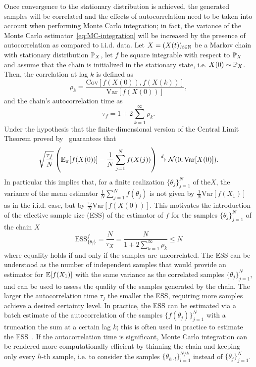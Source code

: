 Once convergence to the stationary distribution is achieved, the generated samples will be correlated and the effects of autocorrelation need to be taken into account when performing Monte Carlo integration; in fact, the variance of the Monte Carlo estimator~\eqref{eq:MC-integration} will be increased by the presence of autocorrelation as compared to i.i.d. data.
Let $X = (X(t))_{t\in \mathbb N}$ be a Markov chain with stationary distribution $\mathbb P_X$, let $f$ be square integrable with respect to $\mathbb P_X$ and assume that the chain is initialized in the stationary state, i.e. $X(0) \sim \mathbb P_X$.
Then, the correlation at lag $k$ is defined as
\[
    \rho_k = \frac{\text{Cov}[f(X(0)), f(X(k))]}{\text{Var}[f(X(0))]},
\]
and the chain's autocorrelation time as
\[
    \tau_f = 1 + 2 \sum_{k=1}^{\infty} \rho_k.
\]
Under the hypothesis that the finite-dimensional version of the Central Limit Theorem proved by~\cite{KipnisVaradhan1986} guarantees that 
\[
    \sqrt{\frac{\tau_f}{N}} \left(  \mathbb E_\pi [f(X(0))] - \frac{1}{N} \sum_{j=1}^{N} f(X(j)) \right) \xrightarrow{d} \mathcal N(0, \text{Var}[X(0)]).
\]
In particular this implies that, for a finite realization $\{ \theta_j\}_{j=1}^N$ of the$X$, the variance of the mean estimator $\frac{1}{N} \sum_{j=1}^{N} f(\theta_j)$ is not given by $\frac{1}{N} \text{Var}[f(X_1)]$ as in the i.i.d. case, but by $\frac{\tau_f}{N} \text{Var}[f(X(0))]$.
This motivates the introduction of the effective sample size (ESS) of the estimator of $f$ for the samples $\{\theta_j\}_{j=1}^N$ of the chain $X$
\begin{equation}
    \text{ESS}_{\{\theta_j\}}^f = \frac{N}{\tau_X} = \frac{N}{1 + 2 \sum_{k=1}^{\infty} \rho_k} \leq N
\end{equation}
where equality holds if and only if the samples are uncorrelated.
The ESS can be understood as the number of independent samples that would provide an estimator for $\mathbb E[f(X_1)]$ with the same variance as the correlated samples $\{\theta_j\}_{j=1}^N$, and can be used to assess the quality of the samples generated by the chain.
The larger the autocorrelation time $\tau_f$ the smaller the ESS, requiring more samples achieve a desired certainty level.
In practice, the ESS can be estimated via a batch estimate of the autocorrelation of the samples $\{f(\theta_j)\}_{j=1}^N$ with a truncation the sum at a certain lag $k$; this is often used in practice to estimate the ESS~\cite{Geyer1992}.
If the autocorrelation time is significant, Monte Carlo integration can be rendered more computationally efficient by thinning the chain and keeping only every $h$-th sample, i.e. to consider the samples $\{\theta_{h \cdot l}\}_{l=1}^{N/k}$ instead of $\{\theta_j\}_{j=1}^N$.\medskip

